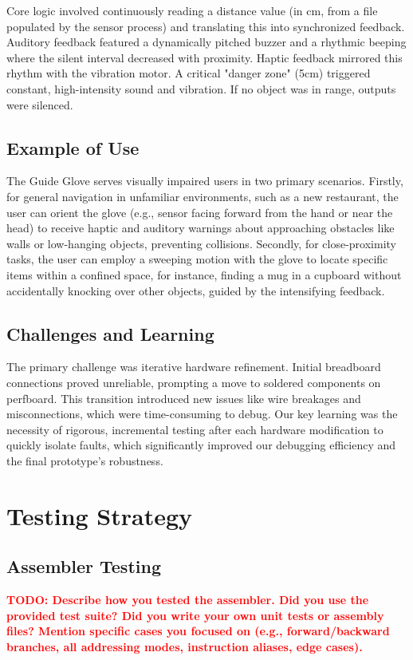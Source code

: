 \documentclass[11pt]{article}
\newcommand{\todo}[1]{\textcolor{red}{\textbf{TODO: #1}}}
\begin{document}
Core logic involved continuously reading a distance value (in cm, from a file populated by the sensor process) and translating this into synchronized feedback. Auditory feedback featured a dynamically pitched buzzer and a rhythmic beeping where the silent interval decreased with proximity. Haptic feedback mirrored this rhythm with the vibration motor. A critical "danger zone" (5cm) triggered constant, high-intensity sound and vibration. If no object was in range, outputs were silenced.

\subsection{Example of Use}
The Guide Glove serves visually impaired users in two primary scenarios. Firstly, for general navigation in unfamiliar environments, such as a new restaurant, the user can orient the glove (e.g., sensor facing forward from the hand or near the head) to receive haptic and auditory warnings about approaching obstacles like walls or low-hanging objects, preventing collisions. Secondly, for close-proximity tasks, the user can employ a sweeping motion with the glove to locate specific items within a confined space, for instance, finding a mug in a cupboard without accidentally knocking over other objects, guided by the intensifying feedback.

\subsection{Challenges and Learning}
The primary challenge was iterative hardware refinement. Initial breadboard connections proved unreliable, prompting a move to soldered components on perfboard. This transition introduced new issues like wire breakages and misconnections, which were time-consuming to debug. Our key learning was the necessity of rigorous, incremental testing after each hardware modification to quickly isolate faults, which significantly improved our debugging efficiency and the final prototype's robustness.


\section{Testing Strategy}

\subsection{Assembler Testing}
\todo{Describe how you tested the assembler. Did you use the provided test suite? Did you write your own unit tests or assembly files? Mention specific cases you focused on (e.g., forward/backward branches, all addressing modes, instruction aliases, edge cases).}
\end{document}
